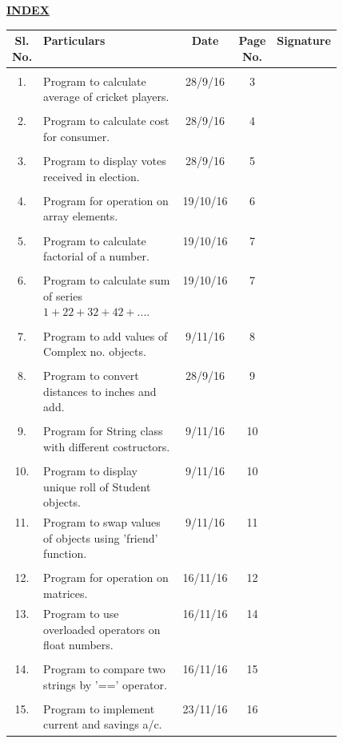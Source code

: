 \documentclass[a4paper,11pt]{article}
\begin{document}
\begin{center}
\LARGE\textbf{\underline{INDEX}}
\end{center}
\thispagestyle{empty}
\begin{tabular}{|c|p{0.48\linewidth}|c|c|c|}
\textbf{Sl. No.}&\textbf{Particulars}&\textbf{Date}&\textbf{Page No.}&\textbf{Signature}\\[5pt] \hline
\\1.&Program to calculate average of cricket players.& 28/9/16 & 3 &\\ \hline
\\2.&Program to calculate cost for consumer.& 28/9/16 & 4 &\\ \hline
\\3.&Program to display votes received in election.& 28/9/16 & 5 &\\ \hline
\\4.&Program for operation on array elements.& 19/10/16 & 6 &\\ \hline
\\5.&Program to calculate factorial of a number.& 19/10/16 & 7 &\\ \hline
\\6.&Program to calculate sum of series$1+22+32+42+...$.& 19/10/16 & 7 &\\ \hline
\\7.&Program to add values of Complex no. objects.& 9/11/16 & 8 &\\ \hline
\\8.&Program to convert distances to inches and add.& 28/9/16 & 9 &\\ \hline
\\9.&Program for String class with different costructors.& 9/11/16 & 10 &\\ \hline
\\10.&Program to display unique roll of Student objects.& 9/11/16 & 10 &\\ \hline
11.&Program to swap values of objects using 'friend' function.& 9/11/16 & 11 &\\ \hline
\\12.&Program for operation on matrices.& 16/11/16 & 12 &\\ \hline
13.&Program to use overloaded operators on float numbers.& 16/11/16 & 14 &\\ \hline
\\14.&Program to compare two strings by '==' operator.& 16/11/16 & 15 &\\ \hline
\\15.&Program to implement current and savings a/c.& 23/11/16 & 16 &\\ \hline

\end{tabular}
\end{document}
